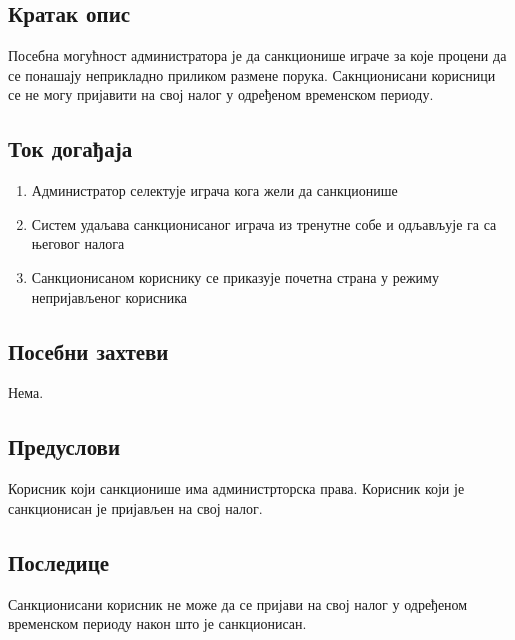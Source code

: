 \subsection{Кратак опис}
Посебна могућност администратора је да санкционише играче за које процени да се понашају
неприкладно приликом размене порука. Сакнционисани корисници се не могу пријавити на свој
налог у одређеном временском периоду.

\subsection{Ток догађаја}
\begin{enumerate}
	\item Администратор селектује играча кога жели да санкционише
	\item Систем удаљава санкционисаног играча из тренутне собе и одљављује га са његовог налога
	\item Санкционисаном кориснику се приказује почетна страна у режиму непријављеног
	      корисника
\end{enumerate}


\subsection{Посебни захтеви}
Нема.

\subsection{Предуслови}
Корисник који санкционише има администрторска права.
Корисник који је санкционисан је пријављен на свој налог.

\subsection{Последице}
Санкционисани корисник не може да се пријави на свој налог у одређеном временском периоду
након што је санкционисан.
